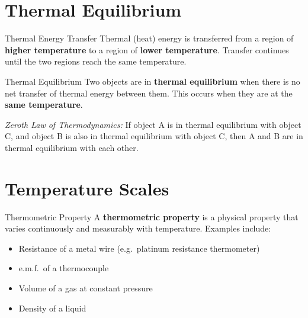 

\section{Thermal Equilibrium}

\begin{definitionbox}{Thermal Energy Transfer}
Thermal (heat) energy is transferred from a region of \textbf{higher temperature} to a region of \textbf{lower temperature}. Transfer continues until the two regions reach the same temperature.
\end{definitionbox}

\begin{definitionbox}{Thermal Equilibrium}
Two objects are in \textbf{thermal equilibrium} when there is no net transfer of thermal energy between them. This occurs when they are at the \textbf{same temperature}.

\medskip
\textit{Zeroth Law of Thermodynamics:} If object A is in thermal equilibrium with object C, and object B is also in thermal equilibrium with object C, then A and B are in thermal equilibrium with each other.
\end{definitionbox}

\section{Temperature Scales}

\begin{definitionbox}{Thermometric Property}
A \textbf{thermometric property} is a physical property that varies continuously and measurably with temperature. Examples include:
\begin{itemize}[itemsep=2pt]
  \item Resistance of a metal wire (e.g.\ platinum resistance thermometer)
  \item e.m.f.\ of a thermocouple
  \item Volume of a gas at constant pressure
  \item Density of a liquid
\end{itemize}
\end{definitionbox}

